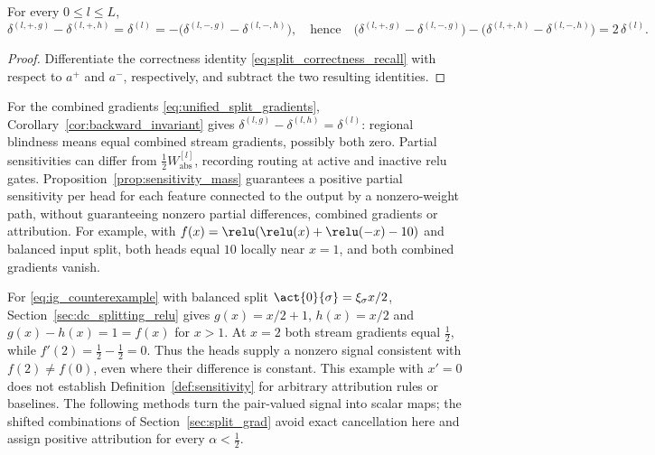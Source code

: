 \begin{corollary}\label{cor:backward_invariant}
For every $0 \leq l \leq L$,
\begin{equation}
	\delta^{(l, +, g)} - \delta^{(l, +, h)} = \delta^{(l)} = -\bigl( \delta^{(l, -, g)} - \delta^{(l, -, h)} \bigr),
	\quad \text{hence} \quad
	\bigl( \delta^{(l,+,g)} - \delta^{(l,-,g)} \bigr) - \bigl( \delta^{(l,+,h)} - \delta^{(l,-,h)} \bigr) = 2\,\delta^{(l)}.
	\label{eq:backward_invariant}
\end{equation}\end{corollary}

\begin{proof}
Differentiate the correctness identity \eqref{eq:split_correctness_recall} with respect to $a^{+}$ and $a^{-}$, respectively, and subtract the two resulting identities.
\end{proof}

For the combined gradients \eqref{eq:unified_split_gradients}, Corollary~\ref{cor:backward_invariant} gives $\delta^{(l,g)}-\delta^{(l,h)}=\delta^{(l)}$: regional blindness means equal combined stream gradients, possibly both zero. Partial sensitivities can differ from $\tfrac12W_{\mathrm{abs}}^{[l]}$, recording routing at active and inactive \ac{relu} gates. Proposition~\ref{prop:sensitivity_mass} guarantees a positive partial sensitivity per head for each feature connected to the output by a nonzero-weight path, without guaranteeing nonzero partial differences, combined gradients or attribution. For example, with $f(x)=\relu(\relu(x)+\relu(-x)-10)$ and balanced input split, both heads equal $10$ locally near $x=1$, and both combined gradients vanish.

\begin{remark}\label{rem:counterexample_split}
For \eqref{eq:ig_counterexample} with balanced split $\act{0}{\sigma}=\xi_\sigma x/2$, Section~\ref{sec:dc_splitting_relu} gives $g(x)=x/2+1$, $h(x)=x/2$ and $g(x)-h(x)=1=f(x)$ for $x>1$. At $x=2$ both stream gradients equal $\tfrac{1}{2}$, while $f'(2)=\tfrac{1}{2}-\tfrac{1}{2}=0$. Thus the heads supply a nonzero signal consistent with $f(2)\neq f(0)$, even where their difference is constant. This example with $x'=0$ does not establish Definition~\ref{def:sensitivity} for arbitrary attribution rules or baselines. The following methods turn the pair-valued signal into scalar maps; the shifted combinations of Section~\ref{sec:split_grad} avoid exact cancellation here and assign positive attribution for every $\alpha<\tfrac{1}{2}$.
\end{remark}


